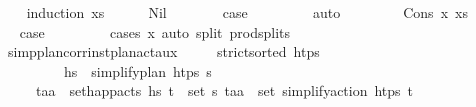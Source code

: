 \begin{isabellebody}
%
\isadelimproof
\ \ %
\endisadelimproof
%
\isatagproof
{}\isamarkupfalse%
\ {\isacharparenleft}{\kern0pt}induction\ xs{\isacharparenright}{\kern0pt}\isanewline
\ \ \ \ \isamarkupfalse%
\ Nil\isanewline
\ \ \ \ \isamarkupfalse%
\ \isamarkupfalse%
\ {\isacharquery}{\kern0pt}case\ \isanewline
\ \ \ \ \ \ \isamarkupfalse%
\ auto\isanewline
\ \ \isamarkupfalse%
\isanewline
\ \ \ \ \isamarkupfalse%
\ {\isacharparenleft}{\kern0pt}Cons\ x\ xs{\isacharparenright}{\kern0pt}\isanewline
\ \ \ \ \isamarkupfalse%
\ \isamarkupfalse%
\ {\isacharquery}{\kern0pt}case\ \isanewline
\ \ \ \ \ \ \isamarkupfalse%
\ {\isacharparenleft}{\kern0pt}cases\ x{\isacharparenright}{\kern0pt}\ {\isacharparenleft}{\kern0pt}auto\ split{\isacharcolon}{\kern0pt}\ prod{\isachardot}{\kern0pt}splits{\isacharparenright}{\kern0pt}\isanewline
\ \ \isamarkupfalse%
%
\endisatagproof
{\isafoldproof}%
%
\isadelimproof
\isanewline
%
\endisadelimproof
\isanewline
\ \ \isamarkupfalse%
\ simp{\isacharunderscore}{\kern0pt}plan{\isacharunderscore}{\kern0pt}corr{\isacharunderscore}{\kern0pt}inst{\isacharunderscore}{\kern0pt}plan{\isacharunderscore}{\kern0pt}act{\isacharunderscore}{\kern0pt}aux{\isacharcolon}{\kern0pt}\isanewline
\ \ \ \ \ {\isachardoublequoteopen}strict{\isacharunderscore}{\kern0pt}sorted\ htps{\isachardoublequoteclose}\isanewline
\ \ \ \ \ \ \ \ \ {\isachardoublequoteopen}hs\ {\isacharequal}{\kern0pt}\ simplify{\isacharunderscore}{\kern0pt}plan\ htps\ {\isasympi}s{\isachardoublequoteclose}\ \isanewline
\ \ \ \ \ {\isachardoublequoteopen}{\isasymforall}{\isacharparenleft}{\kern0pt}t\isactrlsub a{\isacharcomma}{\kern0pt}a{\isacharparenright}{\kern0pt}\ {\isasymin}\ set{\isacharunderscore}{\kern0pt}happ{\isacharunderscore}{\kern0pt}acts\ hs{\isachardot}{\kern0pt}\ {\isasymexists}{\isacharparenleft}{\kern0pt}t\isactrlsub {\isasympi}{\isacharcomma}{\kern0pt}{\isasympi}{\isacharparenright}{\kern0pt}\ {\isasymin}\ set\ {\isasympi}s{\isachardot}{\kern0pt}\ {\isacharparenleft}{\kern0pt}t\isactrlsub a{\isacharcomma}{\kern0pt}a{\isacharparenright}{\kern0pt}\ {\isasymin}\ set\ {\isacharparenleft}{\kern0pt}simplify{\isacharunderscore}{\kern0pt}action\ htps\ {\isacharparenleft}{\kern0pt}t\isactrlsub {\isasympi}{\isacharcomma}{\kern0pt}{\isasympi}{\isacharparenright}{\kern0pt}{\isacharparenright}{\kern0pt}{\isachardoublequoteclose}\isanewline

\end{isabellebody}
